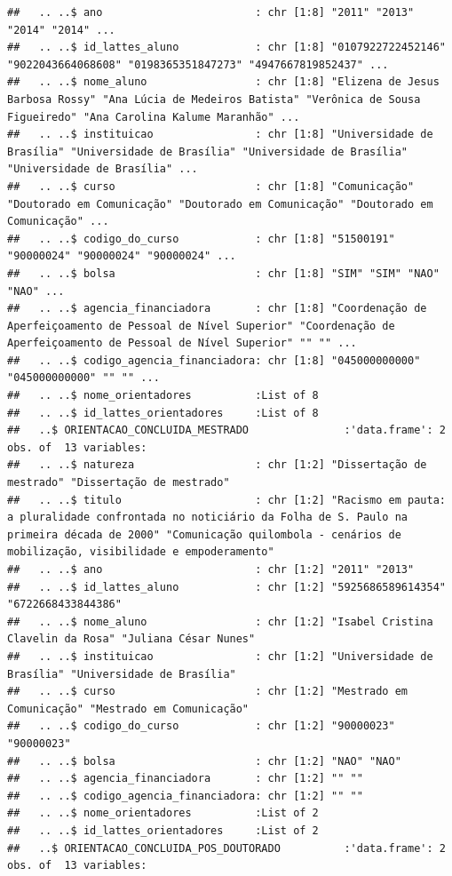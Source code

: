 \documentclass[]{article}
\begin{document}
\begin{verbatim}
##   .. ..$ ano                        : chr [1:8] "2011" "2013" "2014" "2014" ...
##   .. ..$ id_lattes_aluno            : chr [1:8] "0107922722452146" "9022043664068608" "0198365351847273" "4947667819852437" ...
##   .. ..$ nome_aluno                 : chr [1:8] "Elizena de Jesus Barbosa Rossy" "Ana Lúcia de Medeiros Batista" "Verônica de Sousa Figueiredo" "Ana Carolina Kalume Maranhão" ...
##   .. ..$ instituicao                : chr [1:8] "Universidade de Brasília" "Universidade de Brasília" "Universidade de Brasília" "Universidade de Brasília" ...
##   .. ..$ curso                      : chr [1:8] "Comunicação" "Doutorado em Comunicação" "Doutorado em Comunicação" "Doutorado em Comunicação" ...
##   .. ..$ codigo_do_curso            : chr [1:8] "51500191" "90000024" "90000024" "90000024" ...
##   .. ..$ bolsa                      : chr [1:8] "SIM" "SIM" "NAO" "NAO" ...
##   .. ..$ agencia_financiadora       : chr [1:8] "Coordenação de Aperfeiçoamento de Pessoal de Nível Superior" "Coordenação de Aperfeiçoamento de Pessoal de Nível Superior" "" "" ...
##   .. ..$ codigo_agencia_financiadora: chr [1:8] "045000000000" "045000000000" "" "" ...
##   .. ..$ nome_orientadores          :List of 8
##   .. ..$ id_lattes_orientadores     :List of 8
##   ..$ ORIENTACAO_CONCLUIDA_MESTRADO               :'data.frame': 2 obs. of  13 variables:
##   .. ..$ natureza                   : chr [1:2] "Dissertação de mestrado" "Dissertação de mestrado"
##   .. ..$ titulo                     : chr [1:2] "Racismo em pauta: a pluralidade confrontada no noticiário da Folha de S. Paulo na primeira década de 2000" "Comunicação quilombola - cenários de mobilização, visibilidade e empoderamento"
##   .. ..$ ano                        : chr [1:2] "2011" "2013"
##   .. ..$ id_lattes_aluno            : chr [1:2] "5925686589614354" "6722668433844386"
##   .. ..$ nome_aluno                 : chr [1:2] "Isabel Cristina Clavelin da Rosa" "Juliana César Nunes"
##   .. ..$ instituicao                : chr [1:2] "Universidade de Brasília" "Universidade de Brasília"
##   .. ..$ curso                      : chr [1:2] "Mestrado em Comunicação" "Mestrado em Comunicação"
##   .. ..$ codigo_do_curso            : chr [1:2] "90000023" "90000023"
##   .. ..$ bolsa                      : chr [1:2] "NAO" "NAO"
##   .. ..$ agencia_financiadora       : chr [1:2] "" ""
##   .. ..$ codigo_agencia_financiadora: chr [1:2] "" ""
##   .. ..$ nome_orientadores          :List of 2
##   .. ..$ id_lattes_orientadores     :List of 2
##   ..$ ORIENTACAO_CONCLUIDA_POS_DOUTORADO          :'data.frame': 2 obs. of  13 variables:

\end{verbatim}
\end{document}
